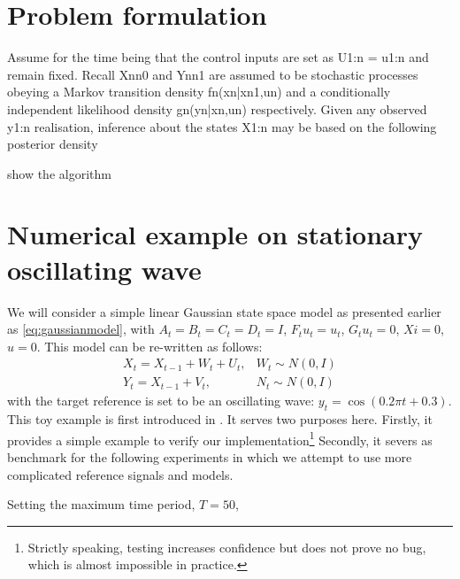 \section{Problem formulation}

Assume for the time being that the control inputs are set as U1:n = u1:n and remain fixed. Recall {Xn}n0 and {Yn}n1 are assumed to be stochastic processes obeying a Markov transition density fn(xn|xn1,un) and a conditionally independent likelihood density gn(yn|xn,un) respectively. Given any observed y1:n realisation, inference about the states X1:n may be based on the following posterior density


show the algorithm


\section{Numerical example on stationary oscillating wave}
We will consider a simple linear Gaussian state space model as presented earlier as \eqref{eq:gaussianmodel}, with $A_t=B_t=C_t=D_t=I$, $F_t{u_t}=u_t$, $G_t{u_t}=0$, $Xi = 0$, $u=0$. This model can be re-written as follows:
\begin{align}
  X_t = X_{t-1} + W_t + U_t, & W_t \sim N(0,I) \\
Y_t = X_{t-1} + V_t, & N_t \sim N(0,I)
\label{eq:refnmodel}
\end{align}
with the target reference is set to be an oscillating wave: $y_t = \cos(0.2 \pi t + 0.3)$. This toy example is first introduced in \cite{NK11}. It serves two purposes here. Firstly, it provides a simple example to verify our implementation\footnote{Strictly speaking, testing increases confidence but  does not prove no bug, which is almost impossible in practice.} Secondly, it severs as benchmark for the following experiments in which we attempt to use more complicated reference signals and models.

Setting the maximum time period, $T=50$, 

